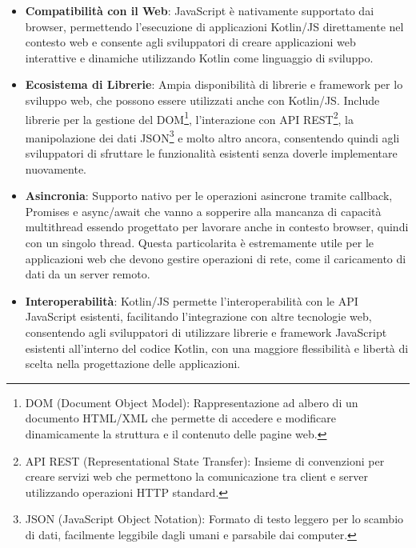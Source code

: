 \documentclass[12pt,a4paper,openright,twoside]{book}
\begin{document}
\begin{itemize}
\item \textbf{Compatibilità con il Web}: JavaScript è nativamente supportato dai browser, permettendo l'esecuzione di applicazioni Kotlin/\ac{JS} direttamente nel contesto web e 
consente agli sviluppatori di creare applicazioni web interattive e dinamiche utilizzando Kotlin come linguaggio di sviluppo.
\item \textbf{Ecosistema di Librerie}: Ampia disponibilità di librerie e framework per lo sviluppo web, che possono essere utilizzati anche con Kotlin/\ac{JS}. 
Include librerie per la gestione del DOM\footnote{
    DOM (Document Object Model): Rappresentazione ad albero di un documento HTML/XML che permette di accedere e modificare dinamicamente la struttura e 
    il contenuto delle pagine web.
}, l'interazione con API REST\footnote{
    API REST (Representational State Transfer): Insieme di convenzioni per creare servizi web che permettono la comunicazione 
    tra client e server utilizzando operazioni HTTP standard.
}, la manipolazione dei dati JSON\footnote{
    JSON (JavaScript Object Notation): Formato di testo leggero per lo scambio di dati, facilmente leggibile dagli umani e parsabile dai computer.
} 
e molto altro ancora, consentendo quindi agli sviluppatori di sfruttare le funzionalità esistenti senza doverle implementare nuovamente.
\item \textbf{Asincronia}: Supporto nativo per le operazioni asincrone tramite callback, Promises e async/await che vanno a sopperire alla mancanza di capacità multithread 
essendo progettato per lavorare anche in contesto browser, quindi con un singolo thread. Questa particolarita è estremamente utile per le applicazioni web che devono gestire 
operazioni di rete, come il caricamento di dati da un server remoto.
\item \textbf{Interoperabilità}: Kotlin/\ac{JS} permette l'interoperabilità con le API JavaScript esistenti, facilitando l'integrazione con altre tecnologie web,
consentendo agli sviluppatori di utilizzare librerie e framework JavaScript esistenti all'interno del codice Kotlin, con una maggiore flessibilità 
e libertà di scelta nella progettazione delle applicazioni.
\end{itemize}
\end{document}
